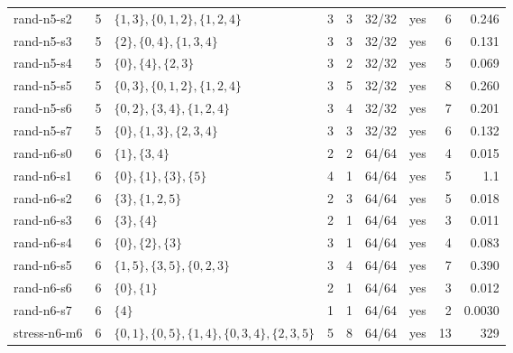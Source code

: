 \begin{table}[tbp]
\begin{tabular}{l r l r r r c r r}
rand-n5-s2 & 5 & $\{1,3\}, \{0,1,2\}, \{1,2,4\}$ & 3 & 3 & 32/32 & yes & 6 & 0.246\\
rand-n5-s3 & 5 & $\{2\}, \{0,4\}, \{1,3,4\}$ & 3 & 3 & 32/32 & yes & 6 & 0.131\\
rand-n5-s4 & 5 & $\{0\}, \{4\}, \{2,3\}$ & 3 & 2 & 32/32 & yes & 5 & 0.069\\
rand-n5-s5 & 5 & $\{0,3\}, \{0,1,2\}, \{1,2,4\}$ & 3 & 5 & 32/32 & yes & 8 & 0.260\\
rand-n5-s6 & 5 & $\{0,2\}, \{3,4\}, \{1,2,4\}$ & 3 & 4 & 32/32 & yes & 7 & 0.201\\
rand-n5-s7 & 5 & $\{0\}, \{1,3\}, \{2,3,4\}$ & 3 & 3 & 32/32 & yes & 6 & 0.132\\
rand-n6-s0 & 6 & $\{1\}, \{3,4\}$ & 2 & 2 & 64/64 & yes & 4 & 0.015\\
rand-n6-s1 & 6 & $\{0\}, \{1\}, \{3\}, \{5\}$ & 4 & 1 & 64/64 & yes & 5 & 1.1\\
rand-n6-s2 & 6 & $\{3\}, \{1,2,5\}$ & 2 & 3 & 64/64 & yes & 5 & 0.018\\
rand-n6-s3 & 6 & $\{3\}, \{4\}$ & 2 & 1 & 64/64 & yes & 3 & 0.011\\
rand-n6-s4 & 6 & $\{0\}, \{2\}, \{3\}$ & 3 & 1 & 64/64 & yes & 4 & 0.083\\
rand-n6-s5 & 6 & $\{1,5\}, \{3,5\}, \{0,2,3\}$ & 3 & 4 & 64/64 & yes & 7 & 0.390\\
rand-n6-s6 & 6 & $\{0\}, \{1\}$ & 2 & 1 & 64/64 & yes & 3 & 0.012\\
rand-n6-s7 & 6 & $\{4\}$ & 1 & 1 & 64/64 & yes & 2 & 0.0030\\
stress-n6-m6 & 6 & $\{0,1\}, \{0,5\}, \{1,4\}, \{0,3,4\}, \{2,3,5\}$ & 5 & 8 & 64/64 & yes & 13 & 329\\
\bottomrule
\end{tabular}
\end{table}
